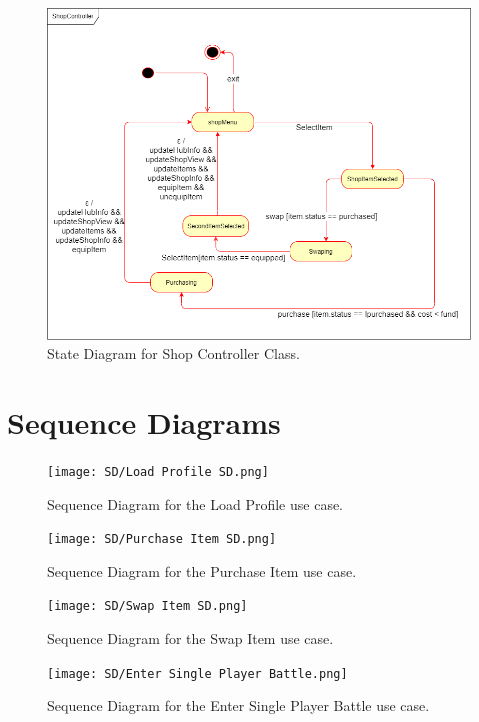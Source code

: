 \documentclass[]{article}
\begin{document}
\begin{figure}[H]
    \centering
    \includegraphics[width=\textwidth]{ShopController.png}
    \caption{State Diagram for Shop Controller Class.}
    \label{fig:ca}
\end{figure}

\section{Sequence Diagrams}
\label{sec:sequence_diagrams}
\begin{figure}[H]
    \centering
    \texttt{[image: SD/Load Profile SD.png]}
    \caption{Sequence Diagram for the Load Profile use case.}
    \label{fig:sd}
\end{figure}

\begin{figure}[H]
    \centering
    \texttt{[image: SD/Purchase Item SD.png]}
    \caption{Sequence Diagram for the Purchase Item use case.}
    \label{fig:sd}
\end{figure}

\begin{figure}[H]
    \centering
    \texttt{[image: SD/Swap Item SD.png]}
    \caption{Sequence Diagram for the Swap Item use case.}
    \label{fig:sd}
\end{figure}

\begin{figure}[H]
    \centering
    \texttt{[image: SD/Enter Single Player Battle.png]}
    \caption{Sequence Diagram for the Enter Single Player Battle use case.}
    \label{fig:sd}
\end{figure}
\end{document}
